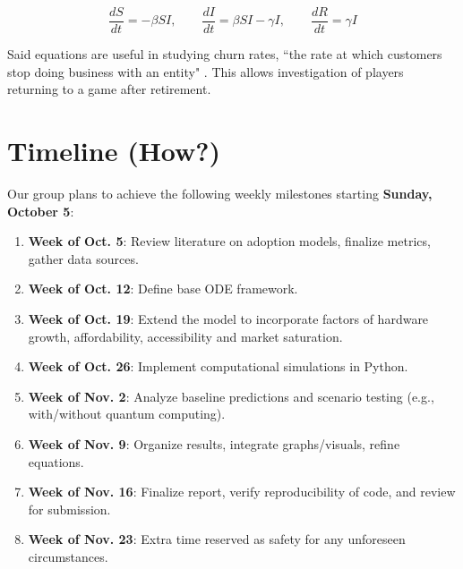 \documentclass{article}
\begin{document}
\begin{equation}
\frac{dS}{dt} = -\beta S I, 
\qquad \frac{dI}{dt} = \beta S I - \gamma I, 
\qquad \frac{dR}{dt} = \gamma I
\end{equation}

\noindent Said equations are useful in studying churn rates, ``the rate at which customers stop doing business with an entity" \cite{INVESTOPEDIA2025CHURN}. This allows investigation of players returning to a game after retirement. 



\section{Timeline (How?)}
Our group plans to achieve the following weekly milestones starting \textbf{Sunday, October 5}: \\

\begin{enumerate}[nosep]
    \item \textbf{Week of Oct. 5}: Review literature on adoption models, finalize metrics, gather data sources.
    \item \textbf{Week of Oct. 12}: Define base ODE framework.
    \item \textbf{Week of Oct. 19}: Extend the model to incorporate factors of hardware growth, affordability, accessibility and market saturation.
    \item \textbf{Week of Oct. 26}: Implement computational simulations in Python. 
    \item \textbf{Week of Nov. 2}: Analyze baseline predictions and scenario testing (e.g., with/without quantum computing).
    \item \textbf{Week of Nov. 9}: Organize results, integrate graphs/visuals, refine equations.
    \item \textbf{Week of Nov. 16}: Finalize report, verify reproducibility of code, and review for submission.
    \item \textbf{Week of Nov. 23}: Extra time reserved as safety for any unforeseen circumstances.

\end{enumerate}
\end{document}
